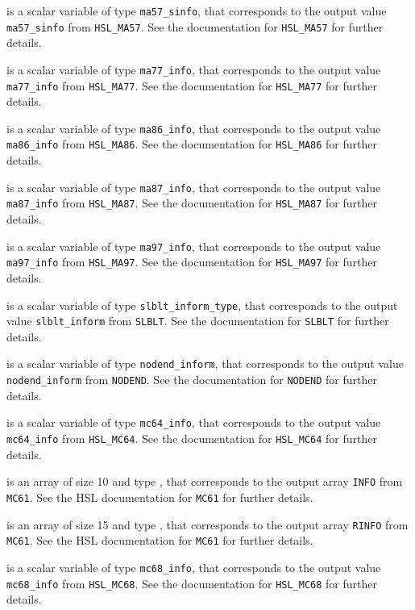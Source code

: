 \documentclass{galahad}
\begin{document}
\begin{description}
 is a scalar variable of type {\tt ma57\_sinfo},
that corresponds to the output value {\tt ma57\_sinfo}
from {\tt HSL\_MA57}. See the documentation for {\tt HSL\_MA57} for further
details.

 is a scalar variable of type {\tt ma77\_info},
that corresponds to the output value {\tt ma77\_info}
from {\tt HSL\_MA77}. See the documentation for {\tt HSL\_MA77} for further
details.

 is a scalar variable of type {\tt ma86\_info},
that corresponds to the output value {\tt ma86\_info}
from {\tt HSL\_MA86}. See the documentation for {\tt HSL\_MA86} for further
details.

 is a scalar variable of type {\tt ma87\_info},
that corresponds to the output value {\tt ma87\_info}
from {\tt HSL\_MA87}. See the documentation for {\tt HSL\_MA87} for further
details.

 is a scalar variable of type {\tt ma97\_info},
that corresponds to the output value {\tt ma97\_info}
from {\tt HSL\_MA97}. See the documentation for {\tt HSL\_MA97} for further
details.

 is a scalar variable of type {\tt slblt\_inform\_type},
that corresponds to the output value {\tt slblt\_inform}
from {\tt SLBLT}. See the documentation for {\tt SLBLT} for further
details.

 is a scalar variable of type {\tt nodend\_inform},
that corresponds to the output value {\tt nodend\_inform}
from {\tt NODEND}. See the documentation for {\tt NODEND} for further
details.

 is a scalar variable of type {\tt mc64\_info},
that corresponds to the output value {\tt mc64\_info}
from {\tt HSL\_MC64}. See the documentation for {\tt HSL\_MC64} for further
details.

 is an array of size 10 and type \integer,
that corresponds to the output array {\tt INFO}
from {\tt MC61}. See the HSL documentation for {\tt MC61} for further
details.

 is an array of size 15 and type \realdp,
that corresponds to the output array {\tt RINFO}
from {\tt MC61}. See the HSL documentation for {\tt MC61} for further
details.

 is a scalar variable of type {\tt mc68\_info},
that corresponds to the output value {\tt mc68\_info}
from {\tt HSL\_MC68}. See the documentation for {\tt HSL\_MC68} for further
details.


\end{description}
\end{document}
